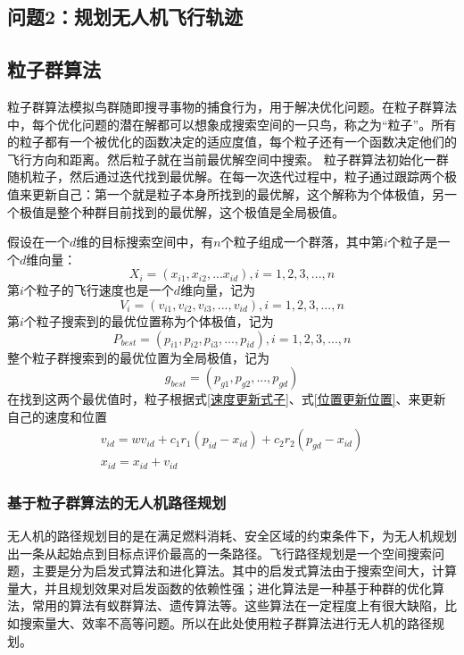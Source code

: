 \documentclass[UTF8,12pt]{ctexart}
\begin{document}
\subsection{问题2：规划无人机飞行轨迹}
\subsection{粒子群算法}
粒子群算法模拟鸟群随即搜寻事物的捕食行为，用于解决优化问题。在粒子群算法中，每个优化问题的潜在解都可以想象成搜索空间的一只鸟，称之为“粒子”。所有的粒子都有一个被优化的函数决定的适应度值，每个粒子还有一个函数决定他们的飞行方向和距离。然后粒子就在当前最优解空间中搜索。
粒子群算法初始化一群随机粒子，然后通过迭代找到最优解。在每一次迭代过程中，粒子通过跟踪两个极值来更新自己：第一个就是粒子本身所找到的最优解，这个解称为个体极值，另一个极值是整个种群目前找到的最优解，这个极值是全局极值。\cite{基于GPU的大规模无人机编队控制并行仿真方法}

假设在一个$d$维的目标搜索空间中，有$n$个粒子组成一个群落，其中第$i$个粒子是一个$d$维向量：
\begin{equation}
    X_i=(x_{i1}, x_{i2}, ... x_{id}), i=1, 2, 3, ...,n
\end{equation}
第$i$个粒子的飞行速度也是一个$d$维向量，记为
\begin{equation}
    V_i=(v_{i1}, v_{i2}, v_{i3}, ..., v_{id}), i=1, 2, 3, ...,n
\end{equation}
第$i$个粒子搜索到的最优位置称为个体极值，记为
\begin{equation}
    P_{best}=(p_{i1}, p_{i2}, p_{i3},..., p_{id}), i=1, 2, 3, ...,n
\end{equation}
整个粒子群搜索到的最优位置为全局极值，记为
\begin{equation}
    g_{best}=(p_{g1}, p_{g2}, ..., p_{gd})
\end{equation}
在找到这两个最优值时，粒子根据式\ref{速度更新式子}、式\ref{位置更新位置}、来更新自己的速度和位置
\begin{gather}
    v_{id}=wv_{id}+c_1r_1(p_{id}-x_{id})+c_2r_2(p_{gd}-x_{id}) \label{速度更新式子}\\
    x_{id}=x_{id}+v_{id}\label{位置更新位置}
\end{gather}
\subsubsection{基于粒子群算法的无人机路径规划}
无人机的路径规划目的是在满足燃料消耗、安全区域的约束条件下，为无人机规划出一条从起始点到目标点评价最高的一条路径。飞行路径规划是一个空间搜索问题，主要是分为启发式算法和进化算法。其中的启发式算法由于搜索空间大，计算量大，并且规划效果对启发函数的依赖性强；进化算法是一种基于种群的优化算法，常用的算法有蚁群算法、遗传算法等。这些算法在一定程度上有很大缺陷，比如搜索量大、效率不高等问题。所以在此处使用粒子群算法进行无人机的路径规划。\cite{基于优化粒子群算法的无人机航路规划}
\end{document}
